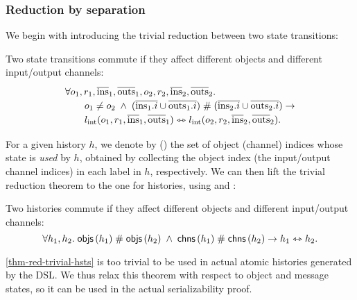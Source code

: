 \subsubsection{Reduction by separation}

We begin with introducing the trivial reduction between two state transitions:
\begin{theorem}
  \label{thm-red-trivial-steps}
  Two state transitions commute if they affect different objects and different input/output channels:
  \begin{displaymath}
    \renewcommand{\arraystretch}{1.2}
    \begin{array}{l}
      \forall o_1, r_1, \listof{\mathrm{ins}}_1, \listof{\mathrm{outs}}_1,
      o_2, r_2, \listof{\mathrm{ins}}_2, \listof{\mathrm{outs}}_2.\\
      \quad\quad o_1 \neq o_2 \;\wedge\; \listdisj{(\listof{\idxOf{\mathrm{ins}_1}} \cup \listof{\idxOf{\mathrm{outs}_1}})}{(\listof{\idxOf{\mathrm{ins}_2}} \cup \listof{\idxOf{\mathrm{outs}_2}})} \to\\
      \quad\quad \commstep{\lblInt{o_1}{r_1}{\listof{\mathrm{ins}}_1}{\listof{\mathrm{outs}}_1}}
                 {\lblInt{o_2}{r_2}{\listof{\mathrm{ins}}_2}{\listof{\mathrm{outs}}_2}}.
    \end{array}
  \end{displaymath}
\end{theorem}

For a given history $h$, we denote by  () the set of object (channel) indices whose state is \emph{used} by $h$, obtained by collecting the object index (the input/output channel indices) in each label in $h$, respectively.
We can then lift the trivial reduction theorem to the one for histories, using  and :
\begin{theorem}
  \label{thm-red-trivial-hsts}
  Two histories commute if they affect different objects and different input/output channels:
  \begin{displaymath}
    \forall h_1, h_2.\; \mathsf{objs}\,(h_1) \; \# \; \mathsf{objs}\,(h_2) \;\wedge\; \mathsf{chns}\,(h_1) \; \# \; \mathsf{chns}\,(h_2) \to h_1 \leftrightarrowtriangle h_2.
  \end{displaymath}
\end{theorem}

\autoref{thm-red-trivial-hsts} is too trivial to be used in actual atomic histories generated by the \hemiola{} DSL.
We thus relax this theorem with respect to object and message states, so it can be used in the actual serializability proof.

